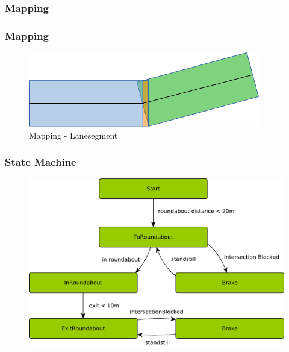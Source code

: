 \documentclass[nosymbols]{beamer}	%
\begin{document}
\begin{frame}
\frametitle{Mapping}
\begin{figure}[!ht]
\begin{center}
\end{center}
\end{figure}
\end{frame}

\begin{frame}
\frametitle{Mapping}
\begin{figure}[!ht]
\begin{center}
\caption{Mapping - Lanesegment}
\includegraphics[width=0.9\textwidth,height=0.7\textheight,keepaspectratio]{bilder/mapping.pdf}
\end{center}
\end{figure}
\end{frame}


\begin{frame}
\frametitle{State Machine}
\begin{figure}[!ht]
\begin{center}
\includegraphics[width=\textwidth,height=0.7\textheight,keepaspectratio]{bilder/stateMachine.pdf}
\end{center}
\end{figure}
\end{frame}
\end{document}
